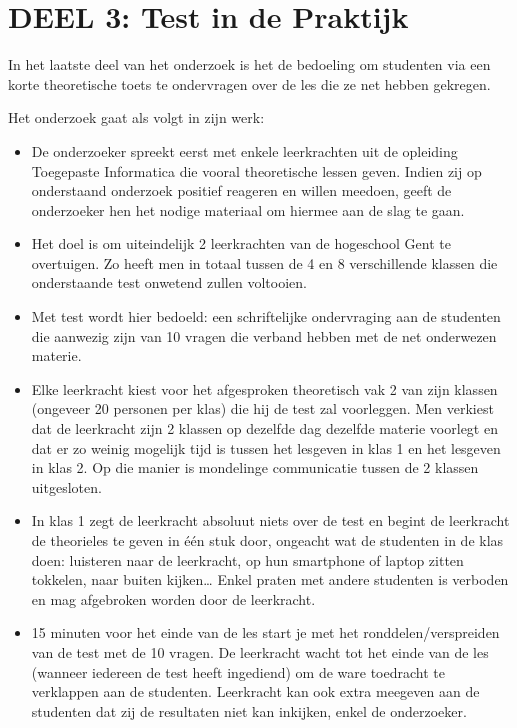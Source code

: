 \section{DEEL 3: Test in de Praktijk}
\label{sec:praktijk}

In het laatste deel van het onderzoek is het de bedoeling om studenten via een korte theoretische toets te ondervragen over de les die ze net hebben gekregen.

Het onderzoek gaat als volgt in zijn werk:

\begin{itemize}
	\item De onderzoeker spreekt eerst met enkele leerkrachten uit de opleiding Toegepaste Informatica die vooral theoretische lessen geven. Indien zij op onderstaand onderzoek positief reageren en willen meedoen, geeft de onderzoeker hen het nodige materiaal om hiermee aan de slag te gaan.
	\item Het doel is om uiteindelijk 2 leerkrachten van de hogeschool Gent te overtuigen. Zo heeft men in totaal tussen de 4 en 8 verschillende klassen die onderstaande test onwetend zullen voltooien.
	\item Met test wordt hier bedoeld: een schriftelijke ondervraging aan de studenten die aanwezig zijn van 10 vragen die verband hebben met de net onderwezen materie.
	\item Elke leerkracht kiest voor het afgesproken theoretisch vak 2 van zijn klassen (ongeveer 20 personen per klas) die hij de test zal voorleggen. Men verkiest dat de leerkracht zijn 2 klassen op dezelfde dag dezelfde materie voorlegt en dat er zo weinig mogelijk tijd is tussen het lesgeven in klas 1 en het lesgeven in klas 2. Op die manier is mondelinge communicatie tussen de 2 klassen uitgesloten.
	\item In klas 1 zegt de leerkracht absoluut niets over de test en begint de leerkracht de theorieles te geven in één stuk door, ongeacht wat de studenten in de klas doen: luisteren naar de leerkracht, op hun smartphone of laptop zitten tokkelen, naar buiten kijken… Enkel praten met andere studenten is verboden en mag afgebroken worden door de leerkracht.
	\item 15 minuten voor het einde van de les start je met het ronddelen/verspreiden van de test met de 10 vragen. De leerkracht wacht tot het einde van de les (wanneer iedereen de test heeft ingediend) om de ware toedracht te verklappen aan de studenten. Leerkracht kan ook extra meegeven aan de studenten dat zij de resultaten niet kan inkijken, enkel de onderzoeker.

\end{itemize}
